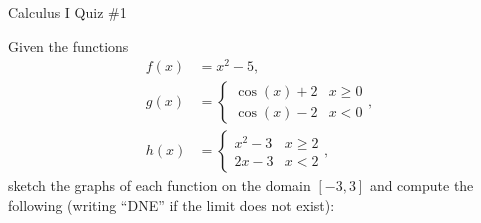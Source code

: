 \documentclass[10pt]{article}
\begin{document}


\begin{center}
Calculus I Quiz \#1
\end{center}

Given the functions
\begin{align*}
f(x) & = x^2 - 5, \\
g(x) & = \left\{\begin{array}{ll} \cos(x) + 2 & x \geq 0 \\ \cos(x) - 2 & x < 0 \end{array}\right., \\
h(x) & = \left\{\begin{array}{ll} x^2 - 3 & x \geq 2 \\ 2x-3 & x < 2 \end{array}\right.,
\end{align*}
sketch the graphs of each function on the domain $[-3, 3]$ and compute the following (writing ``DNE'' if the limit does not exist): 

\vspace{10mm}
\end{document}
